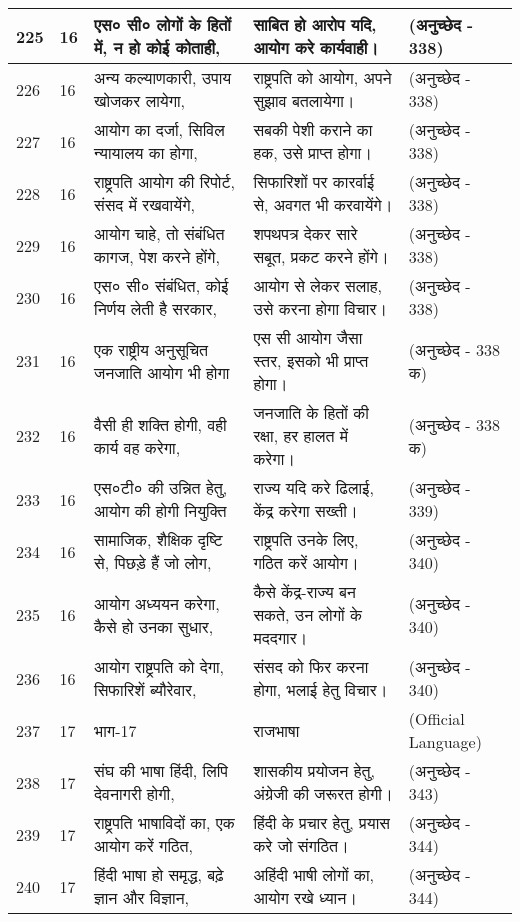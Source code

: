 \begin{longtable}{|l|l|l|l|l|}
225 & 16 & एस० सी० लोगों के हितों में, न हो कोई कोताही, & साबित हो आरोप यदि, आयोग करे कार्यवाही। & (अनुच्छेद - 338) \\ \hline 
226 & 16 & अन्य कल्याणकारी, उपाय खोजकर लायेगा, & राष्ट्रपति को आयोग, अपने सुझाव बतलायेगा। & (अनुच्छेद - 338) \\ \hline 
227 & 16 & आयोग का दर्जा, सिविल न्यायालय का होगा, & सबकी पेशी कराने का हक, उसे प्राप्त होगा। & (अनुच्छेद - 338) \\ \hline 
228 & 16 & राष्ट्रपति आयोग की रिपोर्ट, संसद में रखवायेंगे, & सिफारिशों पर कारर्वाई से, अवगत भी करवायेंगे। & (अनुच्छेद - 338) \\ \hline 
229 & 16 & आयोग चाहे, तो संबंधित कागज, पेश करने होंगे, & शपथपत्र देकर सारे सबूत, प्रकट करने होंगे। & (अनुच्छेद - 338) \\ \hline 
230 & 16 & एस० सी० संबंधित, कोई निर्णय लेती है सरकार, & आयोग से लेकर सलाह, उसे करना होगा विचार। & (अनुच्छेद - 338) \\ \hline 
231 & 16 & एक राष्ट्रीय अनुसूचित जनजाति आयोग भी होगा & एस सी आयोग जैसा स्तर, इसको भी प्राप्त होगा। & (अनुच्छेद - 338 क) \\ \hline 
232 & 16 & वैसी ही शक्ति होगी, वही कार्य वह करेगा, & जनजाति के हितों की रक्षा, हर हालत में करेगा। & (अनुच्छेद - 338 क) \\ \hline 
233 & 16 & एस०टी० की उन्नित हेतु, आयोग की होगी नियुक्ति & राज्य यदि करे ढिलाई, केंद्र करेगा सख्ती। & (अनुच्छेद - 339) \\ \hline 
234 & 16 & सामाजिक, शैक्षिक दृष्टि से, पिछड़े हैं जो लोग, & राष्ट्रपति उनके लिए, गठित करें आयोग। & (अनुच्छेद - 340) \\ \hline 
235 & 16 & आयोग अध्ययन करेगा, कैसे हो उनका सुधार, & कैसे केंद्र-राज्य बन सकते, उन लोगों के मददगार। & (अनुच्छेद - 340) \\ \hline 
236 & 16 & आयोग राष्ट्रपति को देगा, सिफारिशें ब्यौरेवार, & संसद को फिर करना होगा, भलाई हेतु विचार। & (अनुच्छेद - 340) \\ \hline 
237 & 17 & भाग-17 & राजभाषा  & (Official Language) \\ \hline 
238 & 17 & संघ की भाषा हिंदी, लिपि देवनागरी होगी, & शासकीय प्रयोजन हेतु, अंग्रेजी की जरूरत होगी। & (अनुच्छेद - 343) \\ \hline 
239 & 17 & राष्ट्रपति भाषाविदों का, एक आयोग करें गठित, & हिंदी के प्रचार हेतु, प्रयास करे जो संगठित। & (अनुच्छेद - 344) \\ \hline 
240 & 17 & हिंदी भाषा हो समृद्ध, बढ़े ज्ञान और विज्ञान, & अहिंदी भाषी लोगों का, आयोग रखे ध्यान। & (अनुच्छेद - 344) \\ \hline 

\end{longtable}
